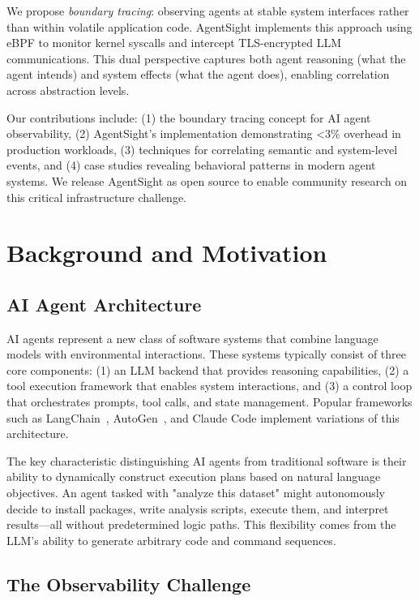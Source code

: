 \documentclass[sigplan,screen，review,9pt]{acmart}
\begin{document}
We propose \emph{boundary tracing}: observing agents at stable system interfaces rather than within volatile application code. AgentSight implements this approach using eBPF to monitor kernel syscalls and intercept TLS-encrypted LLM communications. This dual perspective captures both agent reasoning (what the agent intends) and system effects (what the agent does), enabling correlation across abstraction levels.

Our contributions include: (1) the boundary tracing concept for AI agent observability, (2) AgentSight's implementation demonstrating <3\% overhead in production workloads, (3) techniques for correlating semantic and system-level events, and (4) case studies revealing behavioral patterns in modern agent systems. We release AgentSight as open source to enable community research on this critical infrastructure challenge.

\section{Background and Motivation}

\subsection{AI Agent Architecture}

AI agents represent a new class of software systems that combine language models with environmental interactions. These systems typically consist of three core components: (1) an LLM backend that provides reasoning capabilities, (2) a tool execution framework that enables system interactions, and (3) a control loop that orchestrates prompts, tool calls, and state management. Popular frameworks such as LangChain~\cite{langchain}, AutoGen~\cite{autogen}, and Claude Code implement variations of this architecture.

The key characteristic distinguishing AI agents from traditional software is their ability to dynamically construct execution plans based on natural language objectives. An agent tasked with "analyze this dataset" might autonomously decide to install packages, write analysis scripts, execute them, and interpret results—all without predetermined logic paths. This flexibility comes from the LLM's ability to generate arbitrary code and command sequences.

\subsection{The Observability Challenge}
\end{document}
